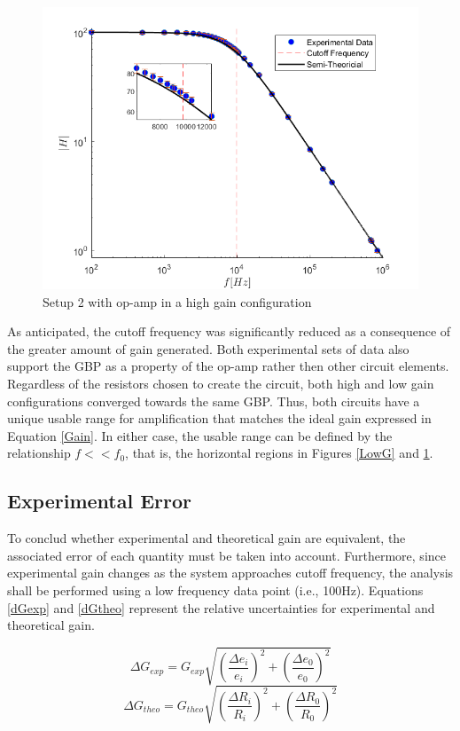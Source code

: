 \documentclass[letterpaper,12pt]{article}
\begin{document}
\begin{figure}[ht]
    \centering
    \includegraphics[scale = .6]{HighGain.png}
    \caption{Setup 2 with op-amp in a high gain configuration}
    \label{HighG}
\end{figure}
As anticipated, the cutoff frequency was significantly reduced as a consequence of the greater amount of gain generated. Both experimental sets of data also support the GBP as a property of the op-amp rather then other circuit elements. Regardless of the resistors chosen to create the circuit, both high and low gain configurations converged towards the same GBP. Thus, both circuits have a unique usable range for amplification that matches the ideal gain expressed in Equation \ref{Gain}. In either case, the usable range can be defined by the relationship $f<<f_0$, that is, the horizontal regions in Figures \ref{LowG} and \ref{HighG}.

\subsection{Experimental Error}
To conclud whether experimental and theoretical gain are equivalent, the associated error of each quantity must be taken into account. Furthermore, since experimental gain changes as the system approaches cutoff frequency, the analysis shall be performed using a low frequency data point (i.e., 100Hz). Equations \ref{dGexp} and \ref{dGtheo} represent the relative uncertainties for experimental and theoretical gain. 

\begin{equation}
    \Delta G_{exp} = G_{exp} \sqrt{ (\frac{\Delta e_i}{e_i})^2 + (\frac{\Delta e_0}{e_0})^2}
    \label{dGexp}
\end{equation}
\begin{equation}
    \Delta G_{theo} = G_{theo}\sqrt{(\frac{\Delta R_i}{R_i})^2 + (\frac{\Delta R_0}{R_0})^2 }
    \label{dGtheo}
\end{equation}
\end{document}
